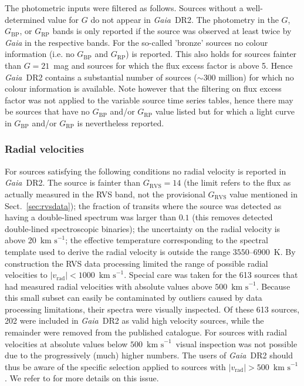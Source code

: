 \documentclass[longauth]{aa_gaia} %
\newcommand\gaia{\textit{Gaia}}
\newcommand\gdr[1]{\gaia~DR#1}
\newcommand\secref[1]{Sect.~\ref{#1}}
\newcommand\kms{\ensuremath{\text{km~s}^{-1}}}
\newcommand\gbp{\ensuremath{G_\mathrm{BP}}}
\newcommand\grp{\ensuremath{G_\mathrm{RP}}}
\newcommand\grvs{\ensuremath{G_\mathrm{RVS}}}
\newcommand\vrad{\ensuremath{v_\mathrm{rad}}}
\begin{document}
The photometric inputs were filtered as follows. Sources without a well-determined value for $G$ do
not appear in \gdr{2}. The photometry in the $G$, {\gbp}, or {\grp} bands is only reported if the
source was observed at least twice by {\gaia} in the respective bands. For the so-called 'bronze'
sources \citep[see \secref{sec:photdata} and][]{DR2-DPACP-44} no colour information (i.e. no {\gbp}
and {\grp}) is reported. This also holds for sources fainter than $G=21$~mag and sources for which
the flux excess factor is above 5. Hence \gdr{2} contains a substantial number of sources ($\sim300$
million) for which no colour information is available. Note however that the filtering on flux
excess factor was not applied to the variable source time series tables, hence there may be sources
that have no {\gbp} and/or {\grp} value listed but for which a light curve in {\gbp} and/or {\grp}
is nevertheless reported.

\subsubsection{Radial velocities}
\label{sec:vradfiltering}

For sources satisfying the following conditions no radial velocity is reported in \gdr{2}. The
source is fainter than $\grvs=14$ (the limit refers to the flux as actually measured in the RVS
band, not the provisional {\grvs} value mentioned in \secref{sec:rvsdata}); the fraction of transits
where the source was detected as having a double-lined spectrum was larger than $0.1$ (this removes
detected double-lined spectroscopic binaries); the uncertainty on the radial velocity is above
20~\kms; the effective temperature corresponding to the spectral template used to derive the radial
velocity is outside the range $3550$--$6900$~K. By construction the RVS data processing limited the
range of possible radial velocities to $|\vrad|<1000$~\kms. Special care was taken for the 613
sources that had measured radial velocities with absolute values above $500$~\kms. Because this
small subset can easily be contaminated by outliers caused by data processing limitations, their
spectra were visually inspected. Of these 613 sources, 202 were included in \gdr{2} as valid high
velocity sources, while the remainder were removed from the published catalogue. For sources with
radial velocities at absolute values below $500$~\kms\ visual inspection was not possible due to the
progressively (much) higher numbers. The users of \gdr{2} should thus be aware of the specific
selection applied to sources with $|\vrad|>500$~\kms. We refer to \cite{DR2-DPACP-54} for more
details on this issue.
\end{document}
